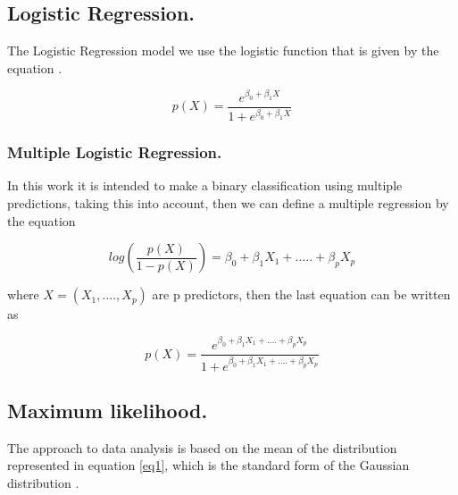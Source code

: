 \documentclass[letterpaper,12pt,openright,oneside]{article}
\begin{document}
     





\subsection{Logistic Regression.}
The Logistic Regression model we use the logistic function that is given by the equation \cite{gjd}.

\begin{equation}
p(X) = \frac{e^{\beta_0 + \beta_1 X} }{1 + e^{\beta_0 + \beta_1 X}}
\end{equation}




\subsubsection{Multiple Logistic Regression.}

In this work it is intended to make a binary classification using multiple predictions, taking this into account, then we can define a multiple regression by the equation \cite{gjd}

\begin{equation}
log(\frac{p(X)}{1-p(X)}) = \beta_0 + \beta_1 X_1 + ..... + \beta_p X_p
\end{equation}

where $X = (X_1,....,X_p)$ are p predictors, then the last equation can be written as 

\begin{equation}
p(X) = \frac{e^{\beta_0 + \beta_1 X_1 +....+\beta_p X_p}}{1 + e^{\beta_0 + \beta_1 X_1 +....+\beta_p X_p}}
\end{equation} 




\subsection{Maximum likelihood.}
The approach to data analysis is based on the mean of the distribution represented in equation \ref{eq1}, which is the standard form of the Gaussian distribution \cite{mb}.

\end{document}
